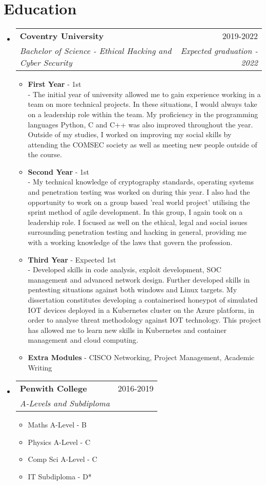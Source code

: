 \documentclass[letterpaper,11pt]{article}
\makeatletter
\newcommand{\resumeItem}[1]{
  \item\small{
    {#1 \vspace{-2pt}}
  }
}
\newcommand{\resumeSubheading}[4]{
  \vspace{-2pt}\item
    \begin{tabular*}{0.97\textwidth}[t]{l@{\extracolsep{\fill}}r}
      \textbf{#1} & #2 \\
      \textit{\small#3} & \textit{\small #4} \\
    \end{tabular*}\vspace{-7pt}
}
\newcommand{\resumeSubHeadingListStart}{\begin{itemize}[leftmargin=0.15in, label={}]}
\newcommand{\resumeSubHeadingListEnd}{\end{itemize}}
\newcommand{\resumeItemListStart}{\begin{itemize}}
\newcommand{\resumeItemListEnd}{\end{itemize}\vspace{-5pt}}
\makeatother
\begin{document}
\section{Education}
  \resumeSubHeadingListStart
    \resumeSubheading
      {Coventry University}{2019-2022}
      {Bachelor of Science - Ethical Hacking and Cyber Security}{Expected graduation - 2022}
          \resumeItemListStart
            \resumeItem{\textbf{First Year} - 1st}\\ 
            - The initial year of university allowed me to gain experience working in a team on more technical projects. In these situations, I would always take on a leadership role within the team.
            My proficiency in the programming languages Python, C and C++ was also improved throughout the year. Outside of my studies, I worked on improving my social skills by attending the COMSEC society as well as meeting new people outside of the course.
            \resumeItem{\textbf{Second Year} - 1st}\\
            - My technical knowledge of cryptography standards, operating systems and penetration testing was worked on during this year. 
            I also had the opportunity to work on a group based 'real world project' utilising the sprint method of agile development. In this group, I again took on a leadership role.
            I focused as well on the ethical, legal and social issues surrounding penetration testing and hacking in general, providing me with a working knowledge of the laws that govern the profession.
            \resumeItem{\textbf{Third Year} - Expected 1st}\\
            - Developed skills in code analysis, exploit development, SOC management and advanced network design.
            Further developed skills in pentesting situations against both windows and Linux targets.
            My dissertation constitutes developing a containerised honeypot of simulated IOT devices deployed in a Kubernetes cluster on the Azure platform, in order to analyse threat methodology against IOT technology.
            This project has allowed me to learn new skills in Kubernetes and container management and cloud computing.
            \resumeItem{\textbf{Extra Modules} - CISCO Networking, Project Management, Academic Writing}
        \resumeItemListEnd
    \resumeSubheading
      {Penwith College}{2016-2019}
      {A-Levels and Subdiploma}{}
          \resumeItemListStart
            \resumeItem{Maths A-Level - B}
            \resumeItem{Physics A-Level - C}
            \resumeItem{Comp Sci A-Level - C}
            \resumeItem{IT Subdiploma - D*}
          \resumeItemListEnd
  \resumeSubHeadingListEnd
\end{document}
